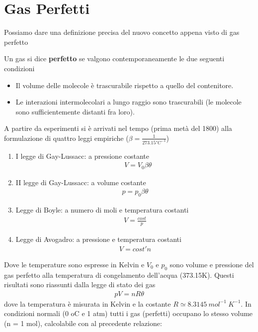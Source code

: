 \documentclass[
10pt, %
a4paper, %
oneside, %
headinclude,footinclude, %
BCOR5mm, %
]{scrartcl}
\begin{document}
\section{Gas Perfetti}
Possiamo dare una definizione precisa del nuovo concetto appena visto di gas perfetto
\begin{definition}
	Un gas si dice \textbf{perfetto} se valgono contemporaneamente le due seguenti condizioni
	\begin{itemize}
		\item Il volume delle molecole è trascurabile rispetto a quello del contenitore.
		\item Le interazioni intermolecolari a lungo raggio sono trascurabili (le molecole sono sufficientemente distanti fra loro). 
	\end{itemize}
\end{definition}
A partire da esperimenti si è arrivati nel tempo (prima metà del 1800) alla formulazione di quattro leggi empiriche ($\beta = \frac{1}{273.15 °C^{-1}}$)
\begin{enumerate}
	\item I legge di Gay-Lussacc: a pressione costante
	\begin{align*} 
		&V = V_0 \beta \theta
	\end{align*} 
	\item II legge di Gay-Lussacc: a volume costante
	\begin{align*} 
		p = p_0 \beta \theta
	\end{align*} 
	\item Legge di Boyle: a numero di moli e temperatura costanti
	\begin{align*} 
		V = \frac{cost}{p}
	\end{align*} 
	\item Legge di Avogadro: a pressione e temperatura costanti
	\begin{align*} 
		V = cost' n
	\end{align*} 
\end{enumerate}
Dove le temperature sono espresse in Kelvin e $V_0$ e $p_0$ sono volume e pressione del gas perfetto alla temperatura di congelamento dell'acqua (373.15\textdegree K). Questi risultati sono riassunti dalla legge di stato dei gas
\begin{align}\label{eq:gaseperfetti}
	pV = nR\theta
\end{align} 
dove la temperatura è misurata in Kelvin e la costante $R\simeq 8.3145\ mol^{-1}\ K^{-1}$. In condizioni normali (0 oC e 1 atm) tutti i gas (perfetti) occupano lo stesso volume (n = 1 mol), calcolabile con al precedente relazione:
\end{document}

